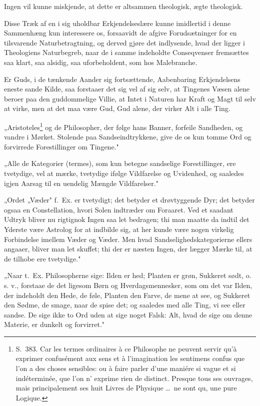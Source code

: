 \documentclass[12pt,a4paper]{article}
\newcommand{\opage}[1]{\marginnote{\footnotesize\textit{[#1]}}}
\begin{document}
Ingen vil kunne miskjende, at dette er altsammen theologisk, ægte theologisk.

Disse Træk af en i sig uholdbar Erkjendelseslære kunne imidlertid i denne
Sammenhæng kun interessere os, forsaavidt de afgive Forudsætninger for en
tilsvarende Naturbetragtning, og derved gjøre det indlysende, hvad der
\opage{17} ligger i Theologiens Naturbegreb, naar de i samme indeholdte Conseqvenser
fremsættes saa klart, saa alsidig, saa uforbeholdent, som hos Malebranche.

Er Guds, i de tænkende Aander sig fortsættende, Aabenbaring Erkjendelsens eneste
sande Kilde, saa forstaaer det sig vel af sig selv, at Tingenes Væsen alene
beroer paa den guddommelige Villie, at Intet i Naturen har Kraft og Magt til
selv at virke, men at det maa være Gud, Gud alene, der virker Alt i alle Ting.

„Aristoteles\footnote{S.~383. Car les termes ordinaires à ce Philosophe ne
peuvent servir qu'à exprimer confusément aux sens et à l'imagination les
sentimens confus que l'on a des choses sensibles: ou à faire parler d'une
maniére si vague et si indéterminée, que l'on n' exprime rien de distinct.
Presque tous ses ouvrages, mais principalement ses huit Livres de Physique
\dots\ ne sont qu, une pure Logique.} og de Philosopher, der følge hans Banner,
forfeile Sandheden, og vandre i Mørket. Stolende paa Sandseindtrykkene, give de
os kun tomme Ord og forvirrede Forestillinger om Tingene."

„Alle de Kategorier (termes), som kun betegne sandselige Forestillinger, ere
tvetydige, vel at mærke, tvetydige ifølge Vildfarelse og Uvidenhed, og saaledes
igjen Aarsag til en uendelig Mængde Vildfarelser."

„Ordet „Væder" f.~Ex. er tvetydigt; det betyder et drøvtyggende Dyr; det betyder
ogsaa en Constellation, hvori Solen indtræder om Foraaret. Ved et saadant Udtryk
bliver nu rigtignok Ingen saa let bedragen; thi man maatte da indtil det Yderste
være Astrolog for at indbilde sig, at her kunde være nogen virkelig Forbindelse
imellem Væder og Væder. Men hvad Sandselighedskategorierne ellers angaaer,
bliver man let skuffet; thi der er næsten Ingen, der lægger Mærke til, at de
tilhobe ere tvetydige."

„Naar t.~Ex. Philosopherne sige: Ilden er hed; Planten er grøn, Sukkeret sødt,
o. s. v., forstaae de det ligesom Børn og Hverdagsmennesker, som om det var
Ilden, der indeholdt den Hede, de føle, Planten den Farve, de mene at see, og
Sukkeret den Sødme, de smage, naar de spise det; og
\opage{18} saaledes med alle Ting, vi see eller sandse. De sige ikke to Ord uden at sige
noget Falsk: Alt, hvad de sige om denne Materie, er dunkelt og forvirret."
\end{document}

